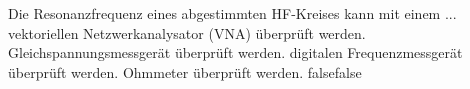     {Die Resonanzfrequenz eines abgestimmten HF-Kreises kann mit einem ...}
    {vektoriellen Netzwerkanalysator (VNA) überprüft werden.}
    {Gleichspannungsmessgerät überprüft werden.}
    {digitalen Frequenzmessgerät überprüft werden.}
    {Ohmmeter überprüft werden.}
    {false}{false}
